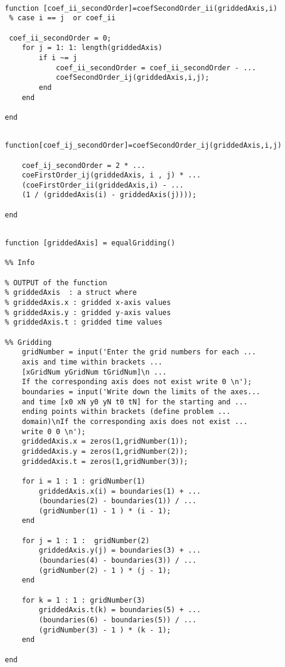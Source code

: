 \begin{lstlisting}

function [coef_ii_secondOrder]=coefSecondOrder_ii(griddedAxis,i)
 % case i == j  or coef_ii 
   
 coef_ii_secondOrder = 0;
    for j = 1: 1: length(griddedAxis)
        if i ~= j
            coef_ii_secondOrder = coef_ii_secondOrder - ...
            coefSecondOrder_ij(griddedAxis,i,j);
        end
    end
    
end

\end{lstlisting}

\begin{lstlisting}

function[coef_ij_secondOrder]=coefSecondOrder_ij(griddedAxis,i,j)

    coef_ij_secondOrder = 2 * ...
    coeFirstOrder_ij(griddedAxis, i , j) * ...
    (coeFirstOrder_ii(griddedAxis,i) - ...
    (1 / (griddedAxis(i) - griddedAxis(j))));

end

\end{lstlisting}

\begin{lstlisting}

function [griddedAxis] = equalGridding()

%% Info
 
% OUTPUT of the function
% griddedAxis  : a struct where
% griddedAxis.x : gridded x-axis values
% griddedAxis.y : gridded y-axis values
% griddedAxis.t : gridded time values

%% Gridding 
    gridNumber = input('Enter the grid numbers for each ...
    axis and time within brackets ... 
    [xGridNum yGridNum tGridNum]\n ...
    If the corresponding axis does not exist write 0 \n');
    boundaries = input('Write down the limits of the axes... 
    and time [x0 xN y0 yN t0 tN] for the starting and ...
    ending points within brackets (define problem ...
    domain)\nIf the corresponding axis does not exist ...
    write 0 0 \n');
    griddedAxis.x = zeros(1,gridNumber(1));
    griddedAxis.y = zeros(1,gridNumber(2));
    griddedAxis.t = zeros(1,gridNumber(3));

    for i = 1 : 1 : gridNumber(1)
        griddedAxis.x(i) = boundaries(1) + ...
        (boundaries(2) - boundaries(1)) / ...
        (gridNumber(1) - 1 ) * (i - 1);
    end
   
    for j = 1 : 1 :  gridNumber(2)
        griddedAxis.y(j) = boundaries(3) + ...
        (boundaries(4) - boundaries(3)) / ...
        (gridNumber(2) - 1 ) * (j - 1);
    end
    
    for k = 1 : 1 : gridNumber(3)
        griddedAxis.t(k) = boundaries(5) + ...
        (boundaries(6) - boundaries(5)) / ...
        (gridNumber(3) - 1 ) * (k - 1);
    end

end

\end{lstlisting}

